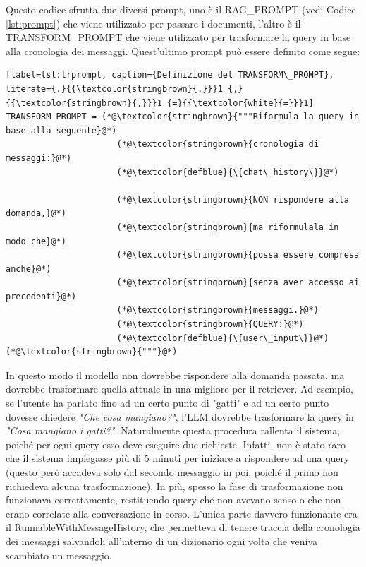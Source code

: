 Questo codice sfrutta due diversi prompt, uno è il RAG\_PROMPT (vedi Codice \ref{lst:prompt}) che viene utilizzato per passare i documenti, l'altro è il TRANSFORM\_PROMPT che viene utilizzato per trasformare la query in base alla cronologia dei messaggi. Quest'ultimo prompt può essere definito come segue:
\begin{lstlisting}[label=lst:trprompt, caption={Definizione del TRANSFORM\_PROMPT}, literate={.}{{\textcolor{stringbrown}{.}}}1 {,}{{\textcolor{stringbrown}{,}}}1 {=}{{\textcolor{white}{=}}}1]
TRANSFORM_PROMPT = (*@\textcolor{stringbrown}{"""Riformula la query in base alla seguente}@*)
                      (*@\textcolor{stringbrown}{cronologia di messaggi:}@*)
                      (*@\textcolor{defblue}{\{chat\_history\}}@*)
                
                      (*@\textcolor{stringbrown}{NON rispondere alla domanda,}@*)
                      (*@\textcolor{stringbrown}{ma riformulala in modo che}@*)
                      (*@\textcolor{stringbrown}{possa essere compresa anche}@*)
                      (*@\textcolor{stringbrown}{senza aver accesso ai precedenti}@*)
                      (*@\textcolor{stringbrown}{messaggi.}@*)
                      (*@\textcolor{stringbrown}{QUERY:}@*)
                      (*@\textcolor{defblue}{\{user\_input\}}@*)(*@\textcolor{stringbrown}{"""}@*)
\end{lstlisting}
In questo modo il modello non dovrebbe rispondere alla domanda passata, ma dovrebbe trasformare quella attuale in una migliore per il retriever. Ad esempio, se l'utente ha parlato fino ad un certo punto di "gatti" e ad un certo punto dovesse chiedere \textit{"Che cosa mangiano?"}, l'LLM dovrebbe trasformare la query in \textit{"Cosa mangiano i gatti?"}. Naturalmente questa procedura rallenta il sistema, poiché per ogni query esso deve eseguire due richieste. Infatti, non è stato raro che il sistema impiegasse più di 5 minuti per iniziare a rispondere ad una query (questo però accadeva solo dal secondo messaggio in poi, poiché il primo non richiedeva alcuna trasformazione). In più, spesso la fase di trasformazione non funzionava correttamente, restituendo query che non avevano senso o che non erano correlate alla conversazione in corso. L'unica parte davvero funzionante era il RunnableWithMessageHistory, che permetteva di tenere traccia della cronologia dei messaggi salvandoli all'interno di un dizionario ogni volta che veniva scambiato un messaggio.


